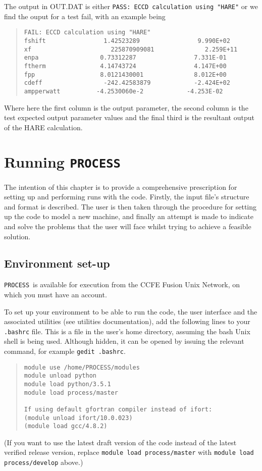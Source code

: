 \documentclass[11pt,a4paper]{report}
\newcommand{\process}{\mbox{\texttt{PROCESS}}}
\newcommand{\setheader}[1]
 {\markright{\rlap{\lower0.8ex\hbox to\textwidth{\hrulefill}}{\bf#1}}}
\newcommand{\mychapter}[1]{\small\normalsize
 \setcounter{footnote}{0}
 \chapter{#1}
 \pagestyle{myheadings}
 \setheader{Chapter \thechapter\hspace{0.8em}#1}}
\begin{document}
The output in OUT.DAT is either \texttt{PASS: ECCD calculation using "HARE"} or we find the ouput for a test fail, with an example being
\begin{quote}
\begin{verbatim}
FAIL: ECCD calculation using "HARE"
fshift                1.42523289                9.990E+02
xf                      225870909081              2.259E+11
enpa                 0.73312287                7.331E-01
ftherm               4.14743724                4.147E+00
fpp                  8.0121430001              8.012E+00 
cdeff                 -242.42583879            -2.424E+02
ampperwatt          -4.2530060e-2            -4.253E-02
\end{verbatim}
\end{quote}
Where here the first column is the output parameter, the second column is the test expected output parameter values and the final third is the resultant output of the HARE calculation. 

\mychapter{Running \process}
\label{chap:run}

The intention of this chapter is to provide a comprehensive prescription for
setting up and performing runs with the code.  Firstly, the input file's
structure and format is described. The user is then taken through the
procedure for setting up the code to model a new machine, and finally an
attempt is made to indicate and solve the problems that the user will face
whilst trying to achieve a feasible solution.

\section{Environment set-up}
\label{sec:run_environment}

 \process\ is available for execution from the CCFE Fusion Unix Network, on which you must have an account.

To set up your environment to be able to run the code, the user interface and the associated
utilities (see utilities documentation), add the following lines to your \texttt{.bashrc} file.  This is a file in the user's home directory, assuming the bash Unix shell is being used.  Although hidden, it can be opened by issuing the relevant command, for example \texttt{gedit .bashrc}.
\begin{quote}
\begin{verbatim}
module use /home/PROCESS/modules
module unload python
module load python/3.5.1
module load process/master

If using default gfortran compiler instead of ifort:
(module unload ifort/10.0.023)
(module load gcc/4.8.2)
\end{verbatim}
\end{quote}
(If you want to use the latest draft version of the code instead of the latest verified release version, replace \texttt{module load process/master} with \texttt{module load process/develop} above.)
\end{document}
